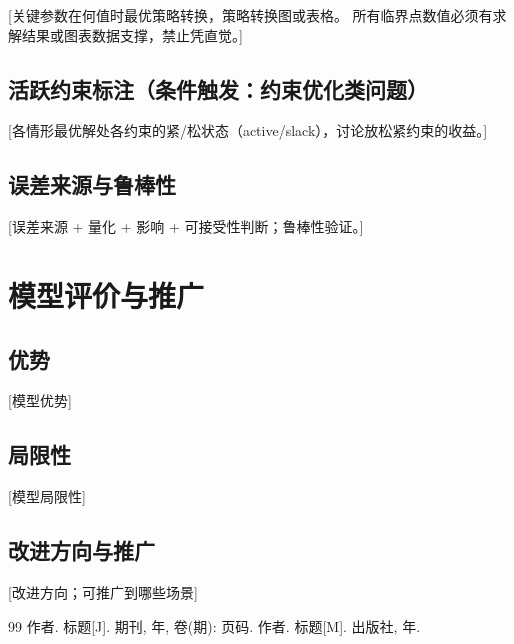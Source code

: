 \documentclass[12pt,a4paper]{ctexart}
\begin{document}
[关键参数在何值时最优策略转换，策略转换图或表格。
所有临界点数值必须有求解结果或图表数据支撑，禁止凭直觉。]

\subsection{活跃约束标注（条件触发：约束优化类问题）}

[各情形最优解处各约束的紧/松状态（active/slack），讨论放松紧约束的收益。]

\subsection{误差来源与鲁棒性}

[误差来源 + 量化 + 影响 + 可接受性判断；鲁棒性验证。]

\section{模型评价与推广}

\subsection{优势}

[模型优势]

\subsection{局限性}

[模型局限性]

\subsection{改进方向与推广}

[改进方向；可推广到哪些场景]


\begin{thebibliography}{99}
 作者. 标题[J]. 期刊, 年, 卷(期): 页码.
 作者. 标题[M]. 出版社, 年.
\end{thebibliography}
\end{document}
